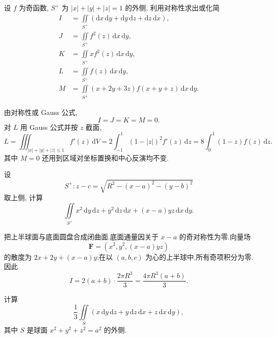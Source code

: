 \begin{example}
    设 $f$ 为奇函数, $S^+$ 为 $|x|+|y|+|z|=1$ 的外侧, 利用对称性求出或化简
    \[
        \begin{aligned}
            I & =\iint\limits_{S^+}(\mathrm{d}x\,\mathrm{d}y+\mathrm{d}y\,\mathrm{d}z+\mathrm{d}z\,\mathrm{d}x), \\
            J & =\iint\limits_{S^+}f^2(z)\,\mathrm{d}x\,\mathrm{d}y,                                             \\
            K & =\iint\limits_{S^+}xf^2(z)\,\mathrm{d}x\,\mathrm{d}y,                                            \\
            L & =\iint\limits_{S^+}f(z)\,\mathrm{d}x\,\mathrm{d}y,                                               \\
            M & =\iint\limits_{S^+}(x+2y+3z)f(x+y+z)\,\mathrm{d}x\,\mathrm{d}y.
        \end{aligned}
    \]
\end{example}
\exampleblank

\begin{solution}
    由对称性或 Gauss 公式,
    \[
        I=J=K=M=0.
    \]
    对 $L$ 用 Gauss 公式并按 $z$ 截面,
    \[
        L=\iiint_{|x|+|y|+|z|\leq1}f'(z)\,\mathrm{d}V
        =2\int_{-1}^1(1-|z|)^2f'(z)\,\mathrm{d}z
        =8\int_0^1(1-z)f(z)\,\mathrm{d}z.
    \]
    其中 $M=0$ 还用到区域对坐标置换和中心反演均不变.
\end{solution}

\begin{example}
    设
    \[
        S^+:z-c=\sqrt{R^2-(x-a)^2-(y-b)^2}
    \]
    取上侧, 计算
    \[
        \iint\limits_{S^+}x^2\,\mathrm{d}y\,\mathrm{d}z+y^2\,\mathrm{d}z\,\mathrm{d}x+(x-a)y z\,\mathrm{d}x\,\mathrm{d}y.
    \]
\end{example}
\exampleblank

\begin{solution}
    把上半球面与底面圆盘合成闭曲面.底面通量因关于 $x-a$ 的奇对称性为零.向量场
    \[
        \bm F=(x^2,y^2,(x-a)yz)
    \]
    的散度为 $2x+2y+(x-a)y$;在以 $(a,b,c)$ 为心的上半球中,所有奇项积分为零.因此
    \[
        I=2(a+b)\cdot\dfrac{2\pi R^3}{3}=\dfrac{4\pi R^3(a+b)}{3}.
    \]
\end{solution}

\begin{example}
    计算
    \[
        \dfrac{1}{3}\iint\limits_S(x\,\mathrm{d}y\,\mathrm{d}z+y\,\mathrm{d}z\,\mathrm{d}x+z\,\mathrm{d}x\,\mathrm{d}y),
    \]
    其中 $S$ 是球面 $x^2+y^2+z^2=a^2$ 的外侧.
\end{example}
\exampleblank

